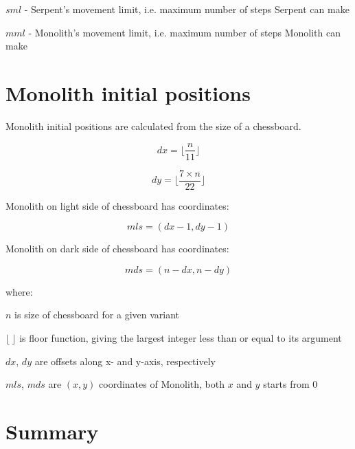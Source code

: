 $sml$ - Serpent's movement limit, i.e. maximum number of steps Serpent can make

$mml$ - Monolith's movement limit, i.e. maximum number of steps Monolith can make

\clearpage %

\section*{Monolith initial positions}
\label{sec:Definitions/Monolith initial positions}

Monolith initial positions are calculated from the size of a chessboard.

\begin{equation}
dx = \lfloor \frac{n}{11} \rfloor
\end{equation}

\begin{equation}
dy = \lfloor \frac{7 \times n}{22} \rfloor
\end{equation}

Monolith on light side of chessboard has coordinates:

\begin{equation}
mls = (dx - 1, dy - 1)
\end{equation}

Monolith on dark side of chessboard has coordinates:

\begin{equation}
mds = (n - dx, n - dy)
\end{equation}

where:

$n$ is size of chessboard for a given variant

$\lfloor\ \rfloor$ is floor function, giving the largest integer less than or equal to its argument

$dx$, $dy$ are offsets along x- and y-axis, respectively

$mls$, $mds$ are $(x, y)$ coordinates of Monolith, both $x$ and $y$ starts from $0$

\clearpage %

\section*{Summary}
\label{sec:Definitions/Summary}

